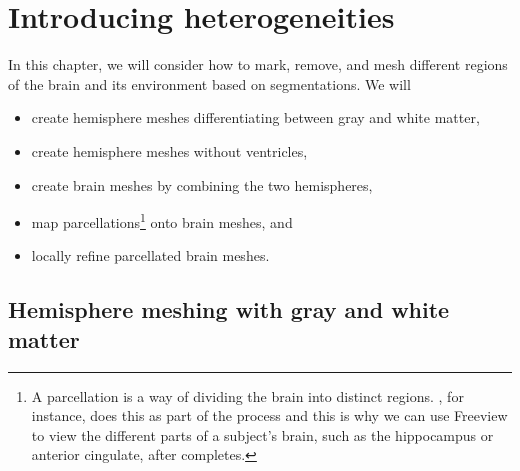 \chapter{Introducing heterogeneities}
\label{chp:chp4}

In this chapter, we will consider how to mark, remove, and mesh
different regions of the brain and its environment based on
{\freesurfer} segmentations. We will
\begin{itemize}
\item
  create hemisphere meshes differentiating between gray and white matter,
\item
  create hemisphere meshes without ventricles,
\item
  create brain meshes by combining the two hemispheres,
\item
  map parcellations\footnote{A parcellation is a way of dividing the brain 
  into distinct regions. {\freesurfer}, for instance, does this as part of 
  the  process and this is why we can use Freeview to view the 
  different parts of a subject's brain, such as the hippocampus or anterior 
  cingulate, after  completes.} 
  onto brain meshes, and
\item
  locally refine parcellated brain meshes.
\end{itemize}

\section{Hemisphere meshing with gray and white matter}
\label{sec:chp4:tools:gray-white}

